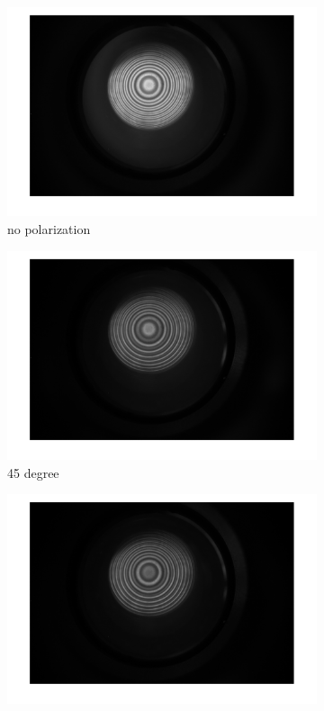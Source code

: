 \documentclass[a4paper,12pt]{article}
\begin{document}
    \begin{figure}[H]
        \centering
        \begin{subfigure}[b]{0.3\textwidth}
            \includegraphics[width=1.2\textwidth]{lon_ano_none.png}
            \caption{no polarization}
        \end{subfigure}
        \space
        \begin{subfigure}[b]{0.3\textwidth}
            \includegraphics[width=1.2\textwidth]{lon_ano_45.png}
            \caption{45 degree}
        \end{subfigure}
        \space
        \begin{subfigure}[b]{0.3\textwidth}
            \includegraphics[width=1.2\textwidth]{lon_ano_-45.png}

\end{subfigure}
\end{figure}
\end{document}
